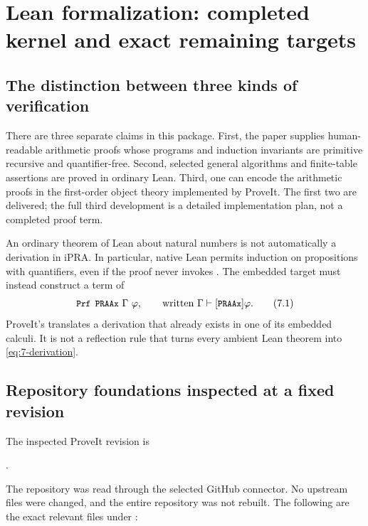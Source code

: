 \section{Lean formalization: completed kernel and exact remaining targets}
\label{sec:formalization}

\subsection{The distinction between three kinds of verification}

There are three separate claims in this package.
First, the paper supplies human-readable arithmetic proofs whose programs
and induction invariants are primitive recursive and quantifier-free.
Second, selected general algorithms and finite-table assertions are proved
in ordinary Lean. Third, one can encode the arithmetic proofs in the
first-order object theory implemented by ProveIt.
The first two are delivered; the full third development is a detailed
implementation plan, not a completed proof term.

An ordinary theorem of Lean about natural numbers is not automatically a
derivation in iPRA. In particular, native Lean permits induction on
propositions with quantifiers, even if the proof never invokes
. The embedded target must instead construct a term of
\[
 \texttt{\small Prf PRAAx}\ \Gamma\ \varphi,
 \qquad\text{written }\Gamma\vdash[\texttt{\small PRAAx}]\varphi.
 \tag{7.1}\label{eq:7-derivation}
\]
ProveIt's  translates a derivation that already
exists in one of its embedded calculi. It is not a reflection rule that
turns every ambient Lean theorem into \eqref{eq:7-derivation}.

\subsection{Repository foundations inspected at a fixed revision}

The inspected ProveIt revision is
\begin{center}
.
\end{center}
The repository was read through the selected GitHub connector. No upstream
files were changed, and the entire repository was not rebuilt.
The following are the exact relevant files under
:

